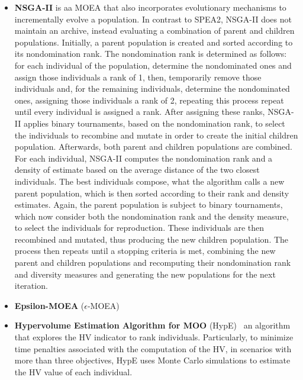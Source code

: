 \begin{itemize}
	\item \textbf{NSGA-II} \cite{Deb2002} is aa \ac{MOEA} that also incorporates evolutionary mechanisms to incrementally evolve a population. In contrast to SPEA2, NSGA-II does not maintain an archive, instead evaluating a combination of parent and children populations. Initially, a parent population is created and sorted according to its nondomination rank. The nondomination rank is determined as follows: for each individual of the population, determine the nondominated ones and assign those individuals a rank of 1, then, temporarily remove those individuals and, for the remaining individuals, determine the nondominated ones, assigning those individuals a rank of 2, repeating this process repeat until every individual is assigned a rank. After assigning these ranks, NSGA-II applies binary tournaments, based on the nondomination rank, to select the individuals to recombine and mutate in order to create the initial children population. Afterwards, both parent and children populations are combined. For each individual, NSGA-II computes the nondomination rank and a density of estimate based on the average distance of the two closest individuals. The best individuals compose, what the algorithm calls a new parent population, which is then sorted according to their rank and density estimates. Again, the parent population is subject to binary tournaments, which now consider both the nondomination rank and the density measure, to select the individuals for reproduction. These individuals are then recombined and mutated, thus producing the new children population. The process then repeats until a stopping criteria is met, combining the new parent and children populations and recomputing their nondomination rank and diversity measures and generating the new populations for the next iteration.
	
	
	\item \textbf{Epsilon-\ac{MOEA}} ($\epsilon$-MOEA) 
	
	\item \textbf{Hypervolume Estimation Algorithm for \ac{MOO}} (HypE)~\cite{Zitzler2011HypE} an algorithm that explores the \ac{HV} indicator to rank individuals. Particularly, to minimize time penalties associated with the computation of the \ac{HV}, in scenarios with more than three objectives, HypE uses Monte Carlo simulations to estimate the \ac{HV} value of each individual.
	

\end{itemize}

